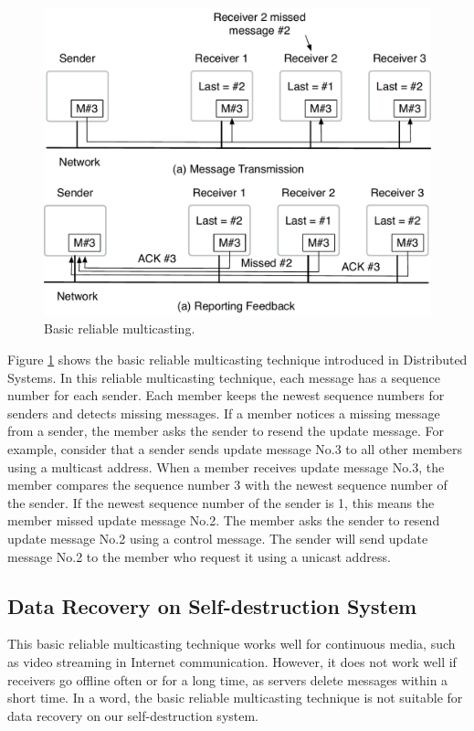 \documentclass[a4paper,11pt]{report}
\begin{document}
\begin{figure}[t]
	\centering
	\includegraphics[scale=0.6]{reliable_multicasting}
	\caption{Basic reliable multicasting.}
	\label{fig:reliable_multicasting}
\end{figure}

Figure \ref{fig:reliable_multicasting} shows the basic reliable multicasting technique introduced in Distributed Systems\cite{tanenbaum2007distributed}.
In this reliable multicasting technique, each message has a sequence number for each sender.
Each member keeps the newest sequence numbers for senders and detects missing messages.
If a member notices a missing message from a sender, the member asks the sender to resend the update message.
For example, consider that a sender sends update message No.3 to all other members using a multicast address.
When a member receives update message No.3, the member compares the sequence number 3 with the newest sequence number of the sender.
If the newest sequence number of the sender is 1, this means the member missed update message No.2.
The member asks the sender to resend update message No.2 using a control message.
The sender will send update message No.2 to the member who request it using a unicast address.

\subsection{Data Recovery on Self-destruction System}
This basic reliable multicasting technique works well for continuous media, such as video streaming in Internet communication.
However, it does not work well if receivers go offline often or for a long time, as servers delete messages within a short time.
In a word, the basic reliable multicasting technique is not suitable for data recovery on our self-destruction system.
\end{document}

